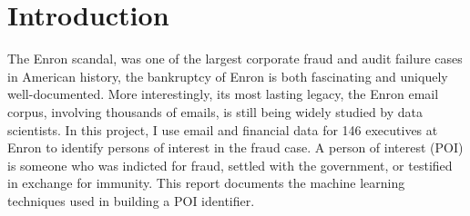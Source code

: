 \documentclass[12pt]{article}
\begin{document}
\maketitle

\section{Introduction}
The Enron scandal, was one of the largest corporate fraud and audit failure cases in American history, the bankruptcy of Enron is both fascinating and uniquely well-documented.  More interestingly, its most lasting legacy, the Enron email corpus, involving thousands of emails, is still being widely studied by data scientists. In this project, I use email and financial data for 146 executives at Enron to identify persons of interest in the fraud case.  A person of interest (POI) is someone who was indicted for fraud, settled with the government, or testified in exchange for immunity.  This report documents the machine learning techniques used in building a POI identifier.
\end{document}
